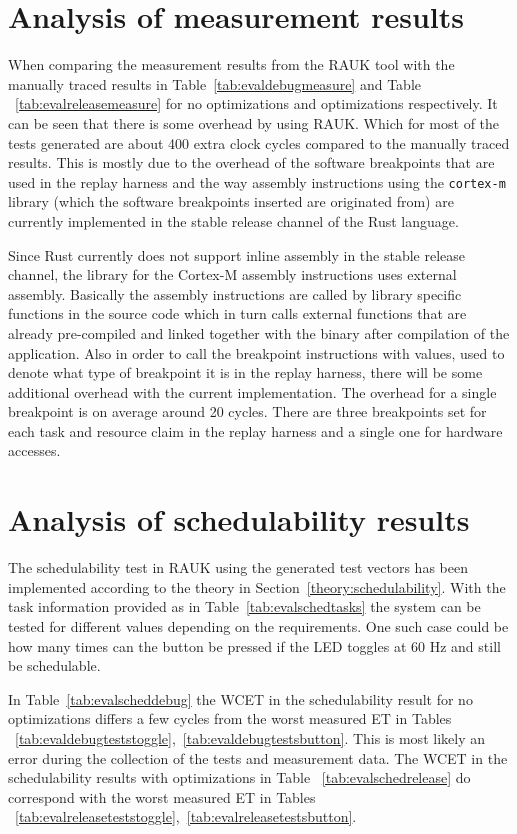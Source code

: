 \section{Analysis of measurement results}
\label{discussion:measurement}
When comparing the measurement results from the RAUK tool with the manually
traced results in Table~\ref{tab:evaldebugmeasure} and Table
~\ref{tab:evalreleasemeasure} for no optimizations and optimizations
respectively. It can be seen that there is some overhead by using RAUK\@. Which
for most of the tests generated are about 400 extra clock cycles compared to
the manually traced results. This is mostly due to the overhead of the software
breakpoints that are used in the replay harness and the way assembly
instructions using the \texttt{cortex-m} library (which the software
breakpoints inserted are originated from) are currently implemented in the
stable release channel of the Rust language.

Since Rust currently does not support inline assembly in the stable release
channel, the library for the Cortex-M assembly instructions uses external
assembly. Basically the assembly instructions are called by library specific
functions in the source code which in turn calls external functions that are
already pre-compiled and linked together with the binary after compilation of
the application. Also in order to call the breakpoint instructions with values,
used to denote what type of breakpoint it is in the replay harness, there will
be some additional overhead with the current implementation. The overhead for a
single breakpoint is on average around 20 cycles. There are three breakpoints
set for each task and resource claim in the replay harness and a single one for
hardware accesses.

\section{Analysis of schedulability results}
The schedulability test in RAUK using the generated test vectors has been
implemented according to the theory in Section~\ref{theory:schedulability}.
With the task information provided as in Table~\ref{tab:evalschedtasks} the
system can be tested for different values depending on the requirements. One
such case could be how many times can the button be pressed if the LED toggles
at 60 Hz and still be schedulable.

In Table~\ref{tab:evalscheddebug} the WCET in the schedulability result for no
optimizations differs a few cycles from the worst measured ET in Tables
~\ref{tab:evaldebugteststoggle},~\ref{tab:evaldebugtestsbutton}. This is most
likely an error during the collection of the tests and measurement data. The
WCET in the schedulability results with optimizations in Table
~\ref{tab:evalschedrelease} do correspond with the worst measured ET in Tables
~\ref{tab:evalreleaseteststoggle},~\ref{tab:evalreleasetestsbutton}.

